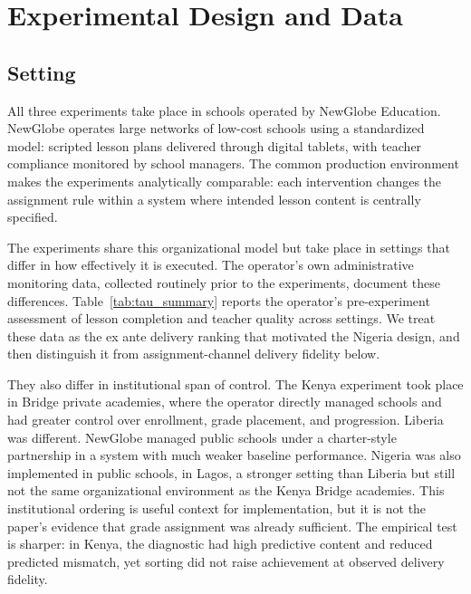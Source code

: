 \documentclass[11pt]{article}
\begin{document}
\section{Experimental Design and Data}
\label{sec:design}

\subsection{Setting}

All three experiments take place in schools operated by NewGlobe Education. NewGlobe operates large networks of low-cost schools using a standardized model: scripted lesson plans delivered through digital tablets, with teacher compliance monitored by school managers. The common production environment makes the experiments analytically comparable: each intervention changes the assignment rule within a system where intended lesson content is centrally specified.

The experiments share this organizational model but take place in settings that differ in how effectively it is executed. The operator's own administrative monitoring data, collected routinely prior to the experiments, document these differences. Table~\ref{tab:tau_summary} reports the operator's pre-experiment assessment of lesson completion and teacher quality across settings. We treat these data as the ex ante delivery ranking that motivated the Nigeria design, and then distinguish it from assignment-channel delivery fidelity below.

They also differ in institutional span of control. The Kenya experiment took place in Bridge private academies, where the operator directly managed schools and had greater control over enrollment, grade placement, and progression. Liberia was different. NewGlobe managed public schools under a charter-style partnership in a system with much weaker baseline performance. Nigeria was also implemented in public schools, in Lagos, a stronger setting than Liberia but still not the same organizational environment as the Kenya Bridge academies. This institutional ordering is useful context for implementation, but it is not the paper's evidence that grade assignment was already sufficient. The empirical test is sharper: in Kenya, the diagnostic had high predictive content and reduced predicted mismatch, yet sorting did not raise achievement at observed delivery fidelity.
\end{document}
